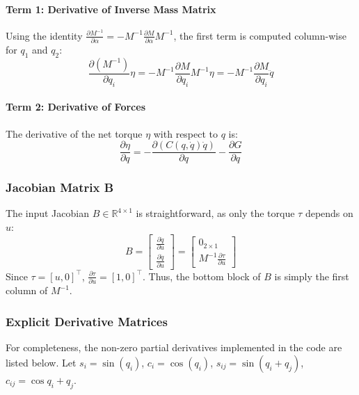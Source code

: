 \paragraph{Term 1: Derivative of Inverse Mass Matrix}
Using the identity $\frac{\partial M^{-1}}{\partial \alpha} = -M^{-1} \frac{\partial M}{\partial \alpha} M^{-1}$, the first term is computed column-wise for $q_1$ and $q_2$:
\begin{equation}
    \frac{\partial (M^{-1})}{\partial q_i} \eta = -M^{-1} \frac{\partial M}{\partial q_i} M^{-1} \eta = -M^{-1} \frac{\partial M}{\partial q_i} \ddot{q}
\end{equation}


\paragraph{Term 2: Derivative of Forces}
The derivative of the net torque $\eta$ with respect to $q$ is:
\begin{equation}
    \frac{\partial \eta}{\partial q} = - \frac{\partial (C(q, \dot{q})\dot{q})}{\partial q} - \frac{\partial G}{\partial q}
\end{equation}


\subsubsection{Jacobian Matrix B}
The input Jacobian $B \in \mathbb{R}^{4 \times 1}$ is straightforward, as only the torque $\tau$ depends on $u$:
\begin{equation}
    B = 
    \begin{bmatrix}
        \frac{\partial \dot{q}}{\partial u} \\
        \frac{\partial \ddot{q}}{\partial u}
    \end{bmatrix}
    =
    \begin{bmatrix}
        0_{2 \times 1} \\
        M^{-1} \frac{\partial \tau}{\partial u}
    \end{bmatrix}
\end{equation}
Since $\tau = [u, 0]^\top$, $\frac{\partial \tau}{\partial u} = [1, 0]^\top$. Thus, the bottom block of $B$ is simply the first column of $M^{-1}$.

\subsubsection{Explicit Derivative Matrices}
For completeness, the non-zero partial derivatives implemented in the code are listed below. Let $s_i = \sin(q_i)$, $c_i = \cos(q_i)$, $s_{ij} = \sin(q_i+q_j)$, $c_{ij} = \cos{q_i+q_j}$.

